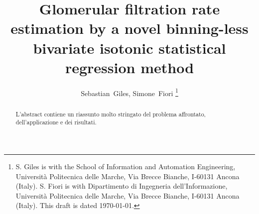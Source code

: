 \documentclass[10pt,final]{siamltex}
\begin{document}
\title{Glomerular filtration rate estimation by a novel binning-less bivariate isotonic statistical regression method}
\author{Sebastian~Giles, Simone~Fiori%
\thanks{S. Giles is with the School of Information and Automation Engineering, 
        Universit\`{a} Politecnica delle Marche, 
        Via Brecce Bianche, I-60131 Ancona (Italy). 
        \newline\indent
        S. Fiori is with Dipartimento di Ingegneria dell'Informazione, 
        Universit\`{a} Politecnica delle Marche, 
        Via Brecce Bianche, I-60131 Ancona (Italy). 
        \newline\indent
        This draft is dated \today.}}
\maketitle
\def\bbbr{\mathbb{R}}
\def\bbbx{\mathbb{X}}
\def\bbby{\mathbb{Y}}
\def\mdef{{\stackrel{{\mathrm{def}}}{=}}}
\renewcommand*{\thefootnote}{\fnsymbol{footnote}}
\def\to{\mathbf{\ to\ }}
\setcounter{footnote}{1}
%
%
\begin{abstract}
{\red L'abstract contiene un riassunto molto stringato del problema affrontato, dell'applicazione e dei risultati.}
\end{abstract}
%
\end{document}
